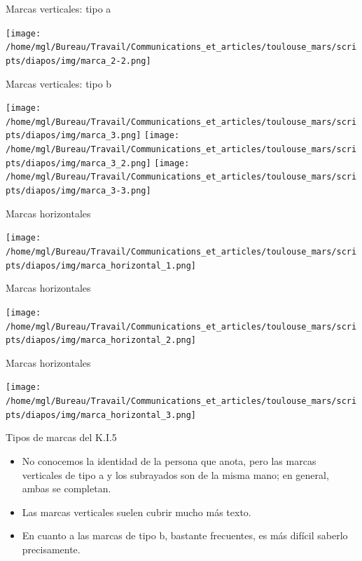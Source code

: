 \documentclass[11pt,aspectratio=169]{beamer}
\begin{document}
\begin{frame}{Marcas verticales: tipo a}
\begin{center}
\texttt{[image: /home/mgl/Bureau/Travail/Communications\_et\_articles/toulouse\_mars/scripts/diapos/img/marca\_2-2.png]}
\end{center}
\end{frame}




\begin{frame}{Marcas verticales: tipo b}
\begin{center}
\texttt{[image: /home/mgl/Bureau/Travail/Communications\_et\_articles/toulouse\_mars/scripts/diapos/img/marca\_3.png]}
\texttt{[image: /home/mgl/Bureau/Travail/Communications\_et\_articles/toulouse\_mars/scripts/diapos/img/marca\_3\_2.png]}
\texttt{[image: /home/mgl/Bureau/Travail/Communications\_et\_articles/toulouse\_mars/scripts/diapos/img/marca\_3-3.png]}
\end{center}
\end{frame}


\begin{frame}{Marcas horizontales}
\begin{center}
\texttt{[image: /home/mgl/Bureau/Travail/Communications\_et\_articles/toulouse\_mars/scripts/diapos/img/marca\_horizontal\_1.png]}
\end{center}
\end{frame}

\begin{frame}{Marcas horizontales}
\begin{center}
\texttt{[image: /home/mgl/Bureau/Travail/Communications\_et\_articles/toulouse\_mars/scripts/diapos/img/marca\_horizontal\_2.png]}
\end{center}
\end{frame}

\begin{frame}{Marcas horizontales}
\begin{center}
\texttt{[image: /home/mgl/Bureau/Travail/Communications\_et\_articles/toulouse\_mars/scripts/diapos/img/marca\_horizontal\_3.png]}
\end{center}
\end{frame}



\begin{frame}{Tipos de marcas del K.I.5}
\begin{itemize}
\item No conocemos la identidad de la persona que anota, pero las marcas verticales de tipo a y los subrayados son de la misma mano; en general, ambas se completan. 
\item Las marcas verticales suelen cubrir mucho más texto. 
\item En cuanto a las marcas de tipo b, bastante frecuentes, es más difícil saberlo precisamente. 
\end{itemize}
\end{frame}
\end{document}
